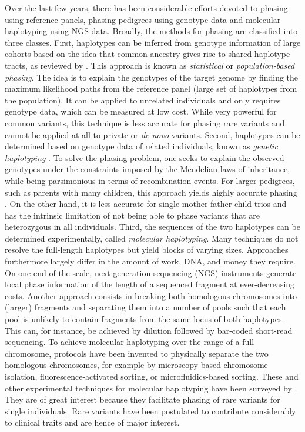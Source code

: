 Over the last few years, there has been considerable efforts devoted to phasing using reference panels, phasing pedigrees using genotype data and molecular haplotyping using NGS data.
Broadly, the methods for phasing are classified into three classes. 
First, haplotypes can be inferred from genotype information of large cohorts based on the idea that common ancestry gives rise to shared haplotype tracts, as reviewed by \cite{Browning2011, loh2016fast, loh2016reference}.
This approach is known as \emph{statistical} or \emph{population-based phasing}.
The idea is to explain the genotypes of the target genome by finding the maximum likelihood paths from the reference panel (large set of haplotypes from the population).
It can be applied to unrelated individuals and only requires genotype data, which can be measured at low cost.
While very powerful for common variants, this technique is less accurate for phasing rare variants and cannot be applied at all to private or \textit{de novo} variants.
%
Second, haplotypes can be determined based on genotype data of related individuals, known as \emph{genetic haplotyping} \citep{Glusman2014}.
To solve the phasing problem, one seeks to explain the observed genotypes under the constraints imposed by the Mendelian laws of inheritance, while being parsimonious in terms of recombination events.
For larger pedigrees, such as parents with many children, this approach yields highly accurate phasing \citep{Roach2011, abecasis2002merlin, williams2010rapid}.
On the other hand, it is less accurate for single mother-father-child trios and has the intrinsic limitation of not being able to phase variants that are heterozygous in all individuals.
%
Third, the sequences of the two haplotypes can be determined experimentally, called \emph{molecular haplotyping}.
Many techniques do not resolve the full-length haplotypes but yield blocks of varying sizes.
Approaches furthermore largely differ in the amount of work, DNA, and money they require.
On one end of the scale, next-generation sequencing (NGS) instruments generate local phase information of the length of a sequenced fragment at ever-decreasing costs.
Another approach consists in breaking both homologous chromosomes into (larger) fragments and separating them into a number of pools such that each pool is unlikely to contain fragments from the same locus of both haplotypes.
This can, for instance, be achieved by dilution followed by bar-coded short-read sequencing.
To achieve molecular haplotyping over the range of a full chromosome, protocols have been invented to physically separate the two homologous chromosomes, for example by microscopy-based chromosome isolation, fluorescence-activated sorting, or microfluidics-based sorting.
These and other experimental techniques for molecular haplotyping have been surveyed by \cite{Snyder2015}.
They are of great interest because they facilitate phasing of rare variants for single individuals.
Rare variants have been postulated to contribute considerably to clinical traits and are hence of major interest.


